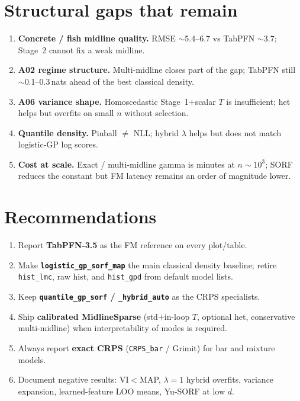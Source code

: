 \documentclass[11pt,a4paper]{article}
\theoremstyle{definition}
\begin{document}
\section{Structural gaps that remain}
\label{sec:gaps}

\begin{enumerate}[leftmargin=1.4em,itemsep=0.2em]
  \item \textbf{Concrete / fish midline quality.} RMSE $\sim$5.4--6.7 vs TabPFN
        $\sim$3.7; Stage~2 cannot fix a weak midline.
  \item \textbf{A02 regime structure.} Multi-midline closes part of the gap;
        TabPFN still $\sim$0.1--0.3\,nats ahead of the best classical density.
  \item \textbf{A06 variance shape.} Homoscedastic Stage~1$+$scalar $T$ is
        insufficient; het helps but overfits on small $n$ without selection.
  \item \textbf{Quantile density.} Pinball $\neq$ NLL; hybrid $\lambda$ helps
        but does not match logistic-GP log scores.
  \item \textbf{Cost at scale.} Exact / multi-midline gamma is minutes at
        $n\sim 10^3$; SORF reduces the constant but FM latency remains an
        order of magnitude lower.
\end{enumerate}

\section{Recommendations}
\label{sec:recs}

\begin{enumerate}[leftmargin=1.4em,itemsep=0.25em]
  \item Report \textbf{TabPFN-3.5} as the FM reference on every plot/table.
  \item Make \textbf{\texttt{logistic\_gp\_sorf\_map}} the main classical
        density baseline; retire \texttt{hist\_lmc}, raw hist, and
        \texttt{hist\_gpd} from default model lists.
  \item Keep \textbf{\texttt{quantile\_gp\_sorf} / \texttt{\_hybrid\_auto}} as
        the CRPS specialists.
  \item Ship \textbf{calibrated MidlineSparse} (std$+$in-loop $T$, optional
        het, conservative multi-midline) when interpretability of modes is
        required.
  \item Always report \textbf{exact CRPS} (\texttt{CRPS\_bar} / Grimit) for
        bar and mixture models.
  \item Document negative results: VI$<$MAP, $\lambda{=}1$ hybrid overfits,
        variance expansion, learned-feature LOO means, Yu-SORF at low $d$.
\end{enumerate}
\end{document}
